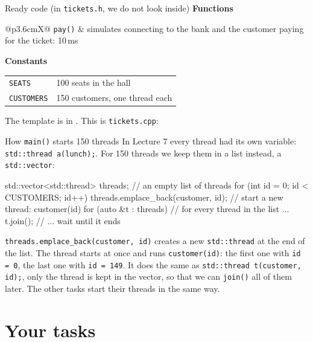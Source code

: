 \begin{note}{Ready code (in \texttt{tickets.h}, we do not look inside)}
\textbf{Functions}\\[2pt]
\begin{tabularx}{\linewidth}{@{}p{3.6cm}X@{}}
\texttt{pay()} & simulates connecting to the bank and the customer paying for the ticket: 10\,ms \\
\end{tabularx}
\par\smallskip\textbf{Constants}\\[2pt]
\begin{tabularx}{\linewidth}{@{}p{3.6cm}X@{}}
\texttt{SEATS} & 100 seats in the hall \\
\texttt{CUSTOMERS} & 150 customers, one thread each \\
\end{tabularx}
\end{note}

\codesection

The template is in . This is \texttt{tickets.cpp}:


\runline

\begin{note}{How \texttt{main()} starts 150 threads}
In Lecture 7 every thread had its own variable: \texttt{std::thread a(lunch);}. For 150 threads we keep them in
a list instead, a \texttt{std::vector}:
\begin{code}
std::vector<std::thread> threads;         // an empty list of threads
for (int id = 0; id < CUSTOMERS; id++)
    threads.emplace_back(customer, id);   // start a new thread: customer(id)
for (auto &t : threads)                   // for every thread in the list ...
    t.join();                             // ... wait until it ends
\end{code}
\texttt{threads.emplace\_back(customer, id)} creates a new \texttt{std::thread} at the end of the list. The thread starts
at once and runs \texttt{customer(id)}: the first one with \texttt{id = 0}, the last one with \texttt{id = 149}. It does the
same as \texttt{std::thread t(customer, id);}, only the thread is kept in the vector, so that we can \texttt{join()} all of
them later. The other tasks start their threads in the same way.
\end{note}

\section{Your tasks}

